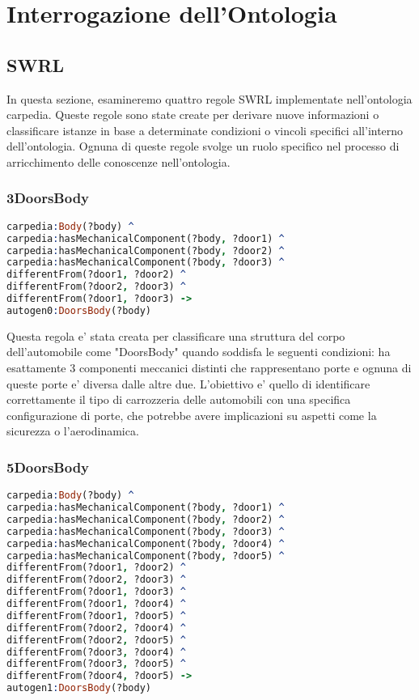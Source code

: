 \chapter{Interrogazione dell'Ontologia}

\section{SWRL}\label{sec:swrl}
In questa sezione, esamineremo quattro regole SWRL implementate nell'ontologia carpedia.
Queste regole sono state create per derivare nuove informazioni o classificare istanze in base a determinate
condizioni o vincoli specifici all'interno dell'ontologia.
Ognuna di queste regole svolge un ruolo specifico nel processo di arricchimento delle conoscenze nell'ontologia.

\subsection{3DoorsBody}

\begin{lstlisting}[language=Prolog]
carpedia:Body(?body) ^
carpedia:hasMechanicalComponent(?body, ?door1) ^
carpedia:hasMechanicalComponent(?body, ?door2) ^
carpedia:hasMechanicalComponent(?body, ?door3) ^
differentFrom(?door1, ?door2) ^
differentFrom(?door2, ?door3) ^
differentFrom(?door1, ?door3) ->
autogen0:DoorsBody(?body)
\end{lstlisting}


Questa regola e' stata creata per classificare una struttura del corpo dell'automobile come "DoorsBody" quando
soddisfa le seguenti condizioni: ha esattamente 3 componenti meccanici distinti che rappresentano porte e ognuna
di queste porte e' diversa dalle altre due.
L'obiettivo e' quello di identificare correttamente il tipo di carrozzeria delle automobili con una
specifica configurazione di porte, che potrebbe avere implicazioni su aspetti come la sicurezza o l'aerodinamica.

\subsection{5DoorsBody}

\begin{lstlisting}[language=Prolog]
carpedia:Body(?body) ^
carpedia:hasMechanicalComponent(?body, ?door1) ^
carpedia:hasMechanicalComponent(?body, ?door2) ^
carpedia:hasMechanicalComponent(?body, ?door3) ^
carpedia:hasMechanicalComponent(?body, ?door4) ^
carpedia:hasMechanicalComponent(?body, ?door5) ^
differentFrom(?door1, ?door2) ^
differentFrom(?door2, ?door3) ^
differentFrom(?door1, ?door3) ^
differentFrom(?door1, ?door4) ^
differentFrom(?door1, ?door5) ^
differentFrom(?door2, ?door4) ^
differentFrom(?door2, ?door5) ^
differentFrom(?door3, ?door4) ^
differentFrom(?door3, ?door5) ^
differentFrom(?door4, ?door5) ->
autogen1:DoorsBody(?body)
\end{lstlisting}


